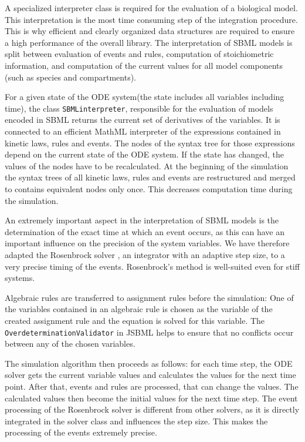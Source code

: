 \documentclass{bioinfo}
\newcommand{\OverdeterminationValidator}{\texttt{Overdetermination\-Validator}}
\newcommand{\SBMLinterpreter}{\texttt{SBML\-interpreter}}
\begin{document}
\begin{methods}
A specialized interpreter class is required for the evaluation of a biological model. This interpretation is the most time consuming step of the integration procedure.
This is why efficient and clearly organized data structures are required to
ensure a high performance of the overall library. The interpretation of SBML
models is split between evaluation of events and rules, computation of stoichiometric information, and computation of the current
values for all model components (such as species and compartments).

For a given state of the ODE system\marginpar(the state includes all variables including time), the class \SBMLinterpreter, responsible for the evaluation of models encoded in SBML returns the current set of
derivatives of the variables. It is connected to an efficient
MathML interpreter of the expressions contained in kinetic laws, rules
and events. The nodes of the syntax tree for those expressions depend on the
current state of the ODE system. If the state has changed, the values of the nodes have to be recalculated.
At the beginning of the simulation the syntax trees of all kinetic laws, rules
and events are restructured and merged to contains
equivalent nodes only once. This decreases computation time during
the simulation.

An extremely important aspect in the interpretation of SBML models is the
determination of the exact time at which an event occurs, as this can have an
important influence on the precision of the system variables. We have
therefore adapted the Rosenbrock solver \citep{Kotcon2011}, an
integrator with an adaptive step size, to a very precise timing of the events.
Rosenbrock's method is well-suited even for stiff systems.

Algebraic rules are transferred to assignment rules before the simulation: One
of the variables contained in an algebraic rule is chosen as the variable of the
created assignment rule and the equation is solved for this variable. The
\OverdeterminationValidator{} in JSBML helps to ensure that no conflicts occur
between any of the chosen variables.

The simulation algorithm then proceeds as follows: for each time step, the ODE
solver gets the current variable values and
calculates the values for the next time point. After that, events
and rules are processed, that can change the values. The calculated values
then become the initial values for the next time step. The event processing of the
Rosenbrock solver is different from other solvers, as it
is directly integrated in the solver class and influences the
step size. This makes the processing of the events extremely precise.
\end{methods}
\end{document}
